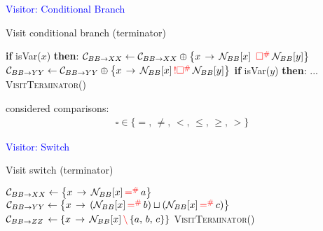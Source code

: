 \begin{frame}[fragile]{\textcolor{blue}{Visitor: Conditional Branch}}


\begin{algorithm}[H]
\caption{Visit conditional branch (terminator)}
\begin{algorithmic}[1]
\State \textbf{if } isVar($x$) \textbf{then}:
\State \qquad$\mathcal{C}_{BB\rightarrow XX} \gets  \mathcal{C}_{BB\rightarrow XX} \oplus \left\lbrace  x\,\rightarrow\, \mathcal{N}_{BB}[x]\,\,\,{\color{red}\square^\#}\,\mathcal{N}_{BB}[y]
\right\rbrace$
\State \qquad$\mathcal{C}_{BB\rightarrow YY} \gets  \mathcal{C}_{BB\rightarrow YY} \oplus \left\lbrace  x\,\rightarrow\, \mathcal{N}_{BB}[x]\,{\color{red}!\square^\#}\,\mathcal{N}_{BB}[y]
\right\rbrace$
\State \textbf{if } isVar($y$) \textbf{then}:
\State \qquad ...
\State \textsc{VisitTerminator}()
\EndProcedure
\end{algorithmic}
\end{algorithm}
considered comparisons:
\begin{align*}
\square \in \{ =,\, \neq,\, < ,\,\le,\,\ge,\, > \}
\end{align*}




\end{frame}



\begin{frame}[fragile]{\textcolor{blue}{Visitor: Switch}}

\begin{algorithm}[H]
\caption{Visit switch (terminator)}
\small
\begin{algorithmic}[1]
\State $\mathcal{C}_{BB\rightarrow XX} \gets \left\lbrace  x\,\rightarrow\, \mathcal{N}_{BB}[x]\,{\color{red}=^\#}\,a
\right\rbrace$
\State $\mathcal{C}_{BB\rightarrow YY} \gets \left\lbrace  x\,\rightarrow\, (\mathcal{N}_{BB}[x]\,{\color{red}=^\#}\,b) \sqcup (\mathcal{N}_{BB}[x]\,{\color{red}=^\#}\,c)
\right\rbrace$
\State $\mathcal{C}_{BB\rightarrow ZZ} \,\gets \left\lbrace  x\,\rightarrow\, \mathcal{N}_{BB}[x]\,{\color{red}\backslash}\,\{a,\,b,\,c\}
\right\rbrace$
\State \textsc{VisitTerminator}()
\EndProcedure
\end{algorithmic}
\end{algorithm}


\end{frame}


